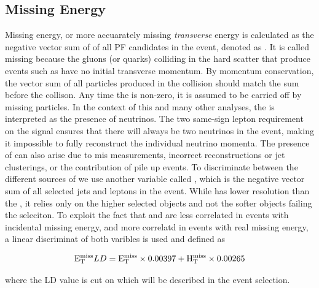 \subsection{Missing Energy}
Missing energy, or more accuarately missing \emph{transverse} energy is calculated as the negative vector sum of \pt of all PF candidates in the event, denoted as \met. It is called missing because
the gluons (or quarks) colliding in the hard scatter that produce events such as \tth have no initial transverse momentum. By momentum conservation, the vector sum of all particles
produced in the collision should match the sum before the collison. Any time the \met is non-zero, it is assumed to be carried off by missing particles. In the context of this and many other analyses,
the \met is interpreted as the presence of neutrinos. The two same-sign lepton requirement on the signal ensures that there will always be two neutrinos in the event, making it impossible to fully
reconstruct the individual neutrino momenta. The presence of \met can also arise due to mis measurements, incorrect reconstructions or jet clusterings, or the contribution of pile up events. To discriminate
between the different sources of \met we use another variable called \HT, which is the negative vector sum of all selected jets and leptons in the event. While \HT has lower resolution than the \met,
it relies only on the higher \pt selected objects and not the softer objects failing the seleciton. To exploit the fact that \HT and \met are less correlated in events with incidental missing energy,
and more correlatd in events with real missing energy, a linear discriminat of both varibles is used and defined as

\begin{equation}
\label{eqn:metld}
 \mathrm{E}^{\mathrm{miss}}_{\mathrm{T}} LD = \mathrm{E}^{\mathrm{miss}}_{\mathrm{T}}\times0.00397 + \mathrm{H}^{\mathrm{miss}}_{\mathrm{T}}\times0.00265
\end{equation}

\noindent where the \met LD value is cut on which will be described in the event selection. 

